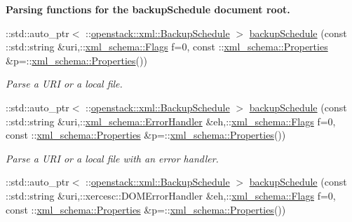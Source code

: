 \begin{Indent}{\bf Parsing functions for the backupSchedule document root.}\par
\begin{DoxyCompactItemize}
\item 
::std::auto\_\-ptr$<$ ::\hyperlink{classopenstack_1_1xml_1_1BackupSchedule}{openstack::xml::BackupSchedule} $>$ \hyperlink{namespaceopenstack_1_1xml_a8c4d45e688715521e43e5326eedf3dd3}{backupSchedule} (const ::std::string \&uri,::\hyperlink{namespacexml__schema_affb4c227cbd9aa7453dd1dc5a1401943}{xml\_\-schema::Flags} f=0, const ::\hyperlink{namespacexml__schema_ad27ce19a7ee1d3b1064092648898f64c}{xml\_\-schema::Properties} \&p=::\hyperlink{namespacexml__schema_ad27ce19a7ee1d3b1064092648898f64c}{xml\_\-schema::Properties}())
\begin{DoxyCompactList}\small\item\em Parse a URI or a local file. \item\end{DoxyCompactList}\item 
::std::auto\_\-ptr$<$ ::\hyperlink{classopenstack_1_1xml_1_1BackupSchedule}{openstack::xml::BackupSchedule} $>$ \hyperlink{namespaceopenstack_1_1xml_a433ff0446639f0f96ea49c894c7ab779}{backupSchedule} (const ::std::string \&uri,::\hyperlink{namespacexml__schema_ab1c9361bfd3b404eaabf0c31eded79dc}{xml\_\-schema::ErrorHandler} \&eh,::\hyperlink{namespacexml__schema_affb4c227cbd9aa7453dd1dc5a1401943}{xml\_\-schema::Flags} f=0, const ::\hyperlink{namespacexml__schema_ad27ce19a7ee1d3b1064092648898f64c}{xml\_\-schema::Properties} \&p=::\hyperlink{namespacexml__schema_ad27ce19a7ee1d3b1064092648898f64c}{xml\_\-schema::Properties}())
\begin{DoxyCompactList}\small\item\em Parse a URI or a local file with an error handler. \item\end{DoxyCompactList}\item 
::std::auto\_\-ptr$<$ ::\hyperlink{classopenstack_1_1xml_1_1BackupSchedule}{openstack::xml::BackupSchedule} $>$ \hyperlink{namespaceopenstack_1_1xml_a56c6c1c4e34aa7e2274c1c67f40f83af}{backupSchedule} (const ::std::string \&uri,::xercesc::DOMErrorHandler \&eh,::\hyperlink{namespacexml__schema_affb4c227cbd9aa7453dd1dc5a1401943}{xml\_\-schema::Flags} f=0, const ::\hyperlink{namespacexml__schema_ad27ce19a7ee1d3b1064092648898f64c}{xml\_\-schema::Properties} \&p=::\hyperlink{namespacexml__schema_ad27ce19a7ee1d3b1064092648898f64c}{xml\_\-schema::Properties}())

\end{DoxyCompactItemize}
\end{Indent}
